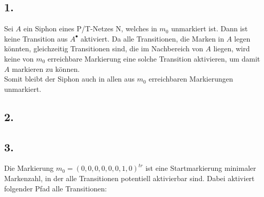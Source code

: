 \documentclass[12pt, paper=a4]{article}
\begin{document}
\subsection*{1.}
Sei \(A\) ein Siphon eines P/T-Netzes N, welches in \(m_0\) unmarkiert ist. Dann ist keine Transition aus \(A^{\bullet}\) aktiviert. Da alle Transitionen, die Marken in \(A\) legen k\"onnten, gleichzeitig Transitionen sind, die im Nachbereich von  \(A\) liegen, wird keine von \(m_0\) erreichbare Markierung eine solche Transition aktivieren, um damit \(A\) markieren zu k\"onnen.\\
Somit bleibt der Siphon auch in allen aus \(m_0\) erreichbaren Markierungen unmarkiert.

\subsection*{2.}
\subsection*{3.}
Die Markierung $m_0 = (0,0,0,0,0,0,1,0)^{tr}$ ist eine Startmarkierung minimaler Markenzahl, in der alle Transitionen potentiell aktivierbar sind. Dabei aktiviert folgender Pfad alle Transitionen:\\
\end{document}
